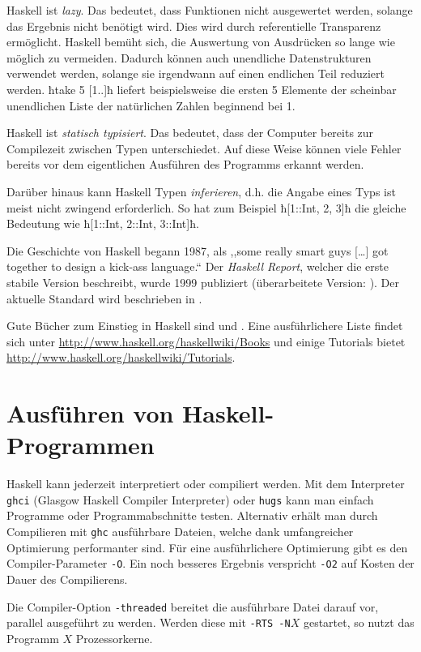Haskell ist \emph{lazy}.
Das bedeutet, dass Funktionen nicht ausgewertet werden, solange das Ergebnis
nicht benötigt wird. Dies wird durch referentielle Transparenz ermöglicht.
Haskell bemüht sich, die Auswertung von Ausdrücken so lange wie möglich zu
vermeiden. 
Dadurch können auch unendliche Datenstrukturen
 verwendet werden, solange sie irgendwann auf einen endlichen Teil
reduziert werden. ħtake 5 [1..]ħ liefert beispielsweise die ersten 5 Elemente
der scheinbar unendlichen Liste der natürlichen Zahlen beginnend bei 1.

Haskell ist \emph{statisch typisiert}.
Das bedeutet, dass der Computer bereits zur Compilezeit zwischen Typen
unterschiedet. Auf diese Weise können viele Fehler bereits vor dem 
eigentlichen Ausführen des Programms erkannt werden.

Darüber hinaus kann Haskell Typen \emph{inferieren},
d.h. die Angabe eines Typs ist meist nicht zwingend erforderlich.
So hat zum Beispiel ħ[1::Int, 2, 3]ħ die gleiche Bedeutung wie 
ħ[1::Int, 2::Int, 3::Int]ħ.

Die Geschichte von Haskell begann 1987, als 
,,some really smart guys [\ldots] got together to design a kick-ass language.``
\autocite[Section 1]{lyahfgg}
Der \emph{Haskell Report}, welcher die erste stabile Version
beschreibt, wurde 1999 publiziert (überarbeitete Version: \autocite{haskell98}).
Der aktuelle Standard wird beschrieben in \autocite{haskell2010}.

Gute Bücher zum Einstieg in Haskell sind \autocite{Hutton} und
\autocite{lyahfgg}. Eine ausführlichere Liste findet sich unter 
\url{http://www.haskell.org/haskellwiki/Books} und 
einige Tutorials bietet 
\url{http://www.haskell.org/haskellwiki/Tutorials}.


\section{Ausführen von Haskell-Programmen}

Haskell kann jederzeit interpretiert oder compiliert werden. Mit dem
Interpreter \texttt{ghci} (Glasgow Haskell Compiler Interpreter)
oder \texttt{hugs} kann man einfach Programme oder
Programmabschnitte testen.
Alternativ erhält man durch Compilieren mit \texttt{ghc} ausführbare Dateien,
welche dank umfangreicher Optimierung performanter sind. Für eine
ausführlichere Optimierung gibt es den Compiler-Parameter \texttt{-O}. Ein
noch besseres Ergebnis verspricht \texttt{-O2} auf Kosten der Dauer des
Compilierens.

Die Compiler-Option \texttt{-threaded} bereitet die ausführbare Datei darauf
vor, parallel ausgeführt zu werden. Werden diese mit \texttt{-RTS -N$X$}
gestartet, so nutzt das Programm $X$ Prozessorkerne.

